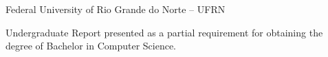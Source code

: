 
\instituicao
{
	Federal University of Rio Grande do Norte -- UFRN 
}
	
\comentario
{
	Undergraduate Report presented as a
	partial requirement for obtaining the degree of Bachelor in
	Computer Science.
}
		
	
\folhaderosto